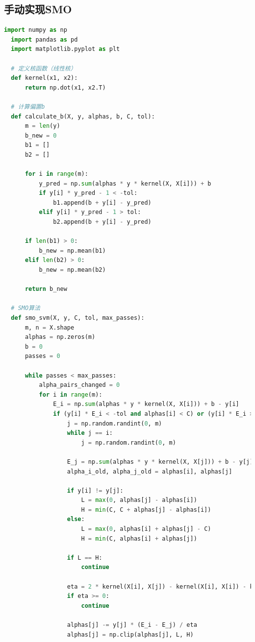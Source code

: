 \documentclass[12pt]{article}
\begin{document}
\subsection{手动实现SMO}
\begin{lstlisting}[language=Python]
  import numpy as np
  import pandas as pd
  import matplotlib.pyplot as plt
  
  # 定义核函数（线性核）
  def kernel(x1, x2):
      return np.dot(x1, x2.T)
  
  # 计算偏置b
  def calculate_b(X, y, alphas, b, C, tol):
      m = len(y)
      b_new = 0
      b1 = []
      b2 = []
  
      for i in range(m):
          y_pred = np.sum(alphas * y * kernel(X, X[i])) + b
          if y[i] * y_pred - 1 < -tol:
              b1.append(b + y[i] - y_pred)
          elif y[i] * y_pred - 1 > tol:
              b2.append(b + y[i] - y_pred)
  
      if len(b1) > 0:
          b_new = np.mean(b1)
      elif len(b2) > 0:
          b_new = np.mean(b2)
  
      return b_new
  
  # SMO算法
  def smo_svm(X, y, C, tol, max_passes):
      m, n = X.shape
      alphas = np.zeros(m)
      b = 0
      passes = 0
  
      while passes < max_passes:
          alpha_pairs_changed = 0
          for i in range(m):
              E_i = np.sum(alphas * y * kernel(X, X[i])) + b - y[i]
              if (y[i] * E_i < -tol and alphas[i] < C) or (y[i] * E_i > tol and alphas[i] > 0):
                  j = np.random.randint(0, m)
                  while j == i:
                      j = np.random.randint(0, m)
  
                  E_j = np.sum(alphas * y * kernel(X, X[j])) + b - y[j]
                  alpha_i_old, alpha_j_old = alphas[i], alphas[j]
  
                  if y[i] != y[j]:
                      L = max(0, alphas[j] - alphas[i])
                      H = min(C, C + alphas[j] - alphas[i])
                  else:
                      L = max(0, alphas[i] + alphas[j] - C)
                      H = min(C, alphas[i] + alphas[j])
  
                  if L == H:
                      continue
  
                  eta = 2 * kernel(X[i], X[j]) - kernel(X[i], X[i]) - kernel(X[j], X[j])
                  if eta >= 0:
                      continue
  
                  alphas[j] -= y[j] * (E_i - E_j) / eta
                  alphas[j] = np.clip(alphas[j], L, H)
  

\end{lstlisting}
\end{document}
